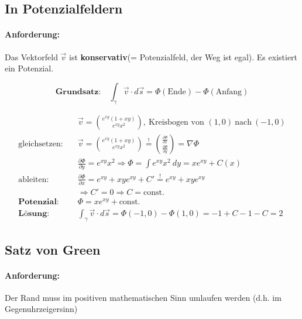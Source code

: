 \documentclass[11pt]{article}
\begin{document}
\subsection{In Potenzialfeldern}

\paragraph{Anforderung:} Das Vektorfeld $\vec{v}$ ist \textbf{konservativ}(= Potenzialfeld, der Weg ist egal). Es existiert ein Potenzial.

\begin{equation*}
	\textbf{Grundsatz:}\quad\int_\gamma \vec{v} \cdot d\vec{s} = \Phi(\text{Ende}) - \Phi(\text{Anfang})
\end{equation*}

\begin{equation*}
\begin{split}
	& \vec{v} = \binom{e^{xy}(1 + xy)}{e^{xy}x^2},\ \text{Kreisbogen von } (1,0)\ \text{nach}\ (-1,0) \\
	\text{gleichsetzen:}\quad & \vec{v} = \binom{e^{xy}(1 + xy)}{e^{xy}x^2} \overset{!}{=} \binom{\frac{\partial\Phi}{\partial x}}{\frac{\partial\Phi}{\partial y}} = \nabla\Phi \\
	& \frac{\partial\Phi}{\partial y} = e^{xy}x^2 \Rightarrow \Phi = \int e^{xy}x^2\ dy = xe^{xy} + C(x) \\
	\text{ableiten:}\quad & \frac{\partial\Phi}{\partial x} = e^{xy} + xye^{xy} + C' \overset{!}{=} e^{xy} + xye^{xy} \\
	& \Rightarrow C' = 0 \Rightarrow C = \text{const.} \\
	\textbf{Potenzial:}\quad & \Phi = xe^{xy} + \text{const.} \\
	\textbf{L{\"o}sung:}\quad & \int_\gamma \vec{v} \cdot d\vec{s} = \Phi(-1,0) - \Phi(1,0) = -1 + C -1 - C = 2
\end{split}
\end{equation*}

\subsection{Satz von Green}

\paragraph{Anforderung:} Der Rand muss im positiven mathematischen Sinn umlaufen werden (d.h. im Gegenuhrzeigersinn)
\end{document}
